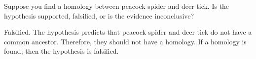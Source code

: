 %
%
%
%
%
%
%
%
%

\question[3]\label{last_phylo}
Suppose you find a homology between peacock spider and deer tick. Is
the hypothesis supported, falsified, or is the evidence inconclusive?
	\begin{solution}
		Falsified. The hypothesis predicts that peacock spider and deer tick do not have a common ancestor. Therefore, they should not have a homology. If a homology is found, then the hypothesis is falsified.
	\end{solution}

\hidepoints